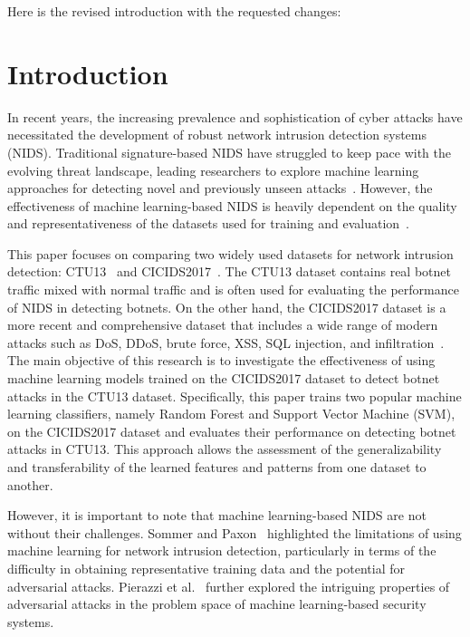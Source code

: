Here is the revised introduction with the requested changes:

\chapter{Introduction}

In recent years, the increasing prevalence and sophistication of cyber attacks have necessitated the development of robust network intrusion detection systems (NIDS). Traditional signature-based NIDS have struggled to keep pace with the evolving threat landscape, leading researchers to explore machine learning approaches for detecting novel and previously unseen attacks~\cite{marchetti2016analysis}. However, the effectiveness of machine learning-based NIDS is heavily dependent on the quality and representativeness of the datasets used for training and evaluation~\cite{engelen2021troubleshooting}.

This paper focuses on comparing two widely used datasets for network intrusion detection: CTU13~\cite{garcia2014empirical} and CICIDS2017~\cite{sharafaldin2018toward}. The CTU13 dataset contains real botnet traffic mixed with normal traffic and is often used for evaluating the performance of NIDS in detecting botnets. On the other hand, the CICIDS2017 dataset is a more recent and comprehensive dataset that includes a wide range of modern attacks such as DoS, DDoS, brute force, XSS, SQL injection, and infiltration~\cite{sharafaldin2018toward}. The main objective of this research is to investigate the effectiveness of using machine learning models trained on the CICIDS2017 dataset to detect botnet attacks in the CTU13 dataset. Specifically, this paper trains two popular machine learning classifiers, namely Random Forest and Support Vector Machine (SVM), on the CICIDS2017 dataset and evaluates their performance on detecting botnet attacks in CTU13. This approach allows the assessment of the generalizability and transferability of the learned features and patterns from one dataset to another.

However, it is important to note that machine learning-based NIDS are not without their challenges. Sommer and Paxon~\cite{sommer2010outside} highlighted the limitations of using machine learning for network intrusion detection, particularly in terms of the difficulty in obtaining representative training data and the potential for adversarial attacks. Pierazzi et al.~\cite{pierazzi2020intriguing} further explored the intriguing properties of adversarial attacks in the problem space of machine learning-based security systems.

